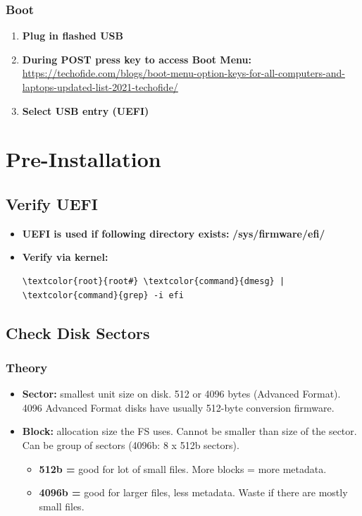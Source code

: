 \documentclass[10pt, a4paper, onecolumn, oneside, titlepage, openany]{book}
\begin{document}
\subsection{Boot}
\begin{enumerate}
    \item \textbf{Plug in flashed USB}
    \item \textbf{During POST press key to access Boot Menu:}
\newline \href{https://techofide.com/blogs/boot-menu-option-keys-for-all-computers-and-laptops-updated-list-2021-techofide/}{https://techofide.com/blogs/boot-menu-option-keys-for-all-computers-and-laptops-updated-list-2021-techofide/}
    \item \textbf{Select USB entry (UEFI)}
\end{enumerate}


\chapter{Pre-Installation}
\section{Verify UEFI}
\begin{itemize}
    \item \textbf{UEFI is used if following directory exists:}
\newline \textbf{\textcolor{dir}{/sys/firmware/efi/}}
    \item \textbf{Verify via kernel:}
\begin{Verbatim}[commandchars=\\\{\}]
\textcolor{root}{root#} \textcolor{command}{dmesg} | \textcolor{command}{grep} -i efi
\end{Verbatim}
\end{itemize}

\section{Check Disk Sectors}
\subsection{Theory}
\begin{itemize}
    \item \textbf{Sector:} smallest unit size on disk. 512 or 4096 bytes (Advanced Format). 4096 Advanced Format disks have usually 512-byte conversion firmware.
    \item \textbf{Block:} allocation size the FS uses. Cannot be smaller than size of the sector. Can be group of sectors (4096b: 8 x 512b sectors).
    \begin{itemize}
        \item \textbf{512b =} good for lot of small files. More blocks = more metadata.
        \item \textbf{4096b =}  good for larger files, less metadata. Waste if there are mostly small files.
    \end{itemize}
\end{itemize}
\end{document}
